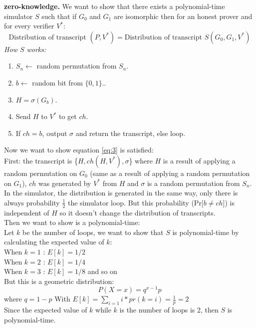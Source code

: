 \documentclass[12pt,a4paper]{article}
\begin{document}
\textbf{zero-knowledge.}
We want to show that there exists a polynomial-time simulator $S$ such that if $G_0$ and  $G_1$ are isomorphic then for an honest prover and for every verifier $V^*$:
\begin{equation}
\text{Distribution of transcript }(P,V^*)=\text{Distribution of transcript } S(G_0,G_1,V^*) 
\label{eq:3}
\end{equation}
\textit{How $S$ works:}
\begin{enumerate}	
	\item
	\begin{enumerate}
$S_n \longleftarrow $ random permutation from $S_n$. 
\end{enumerate}
\item
\begin{enumerate}
$b \longleftarrow$ random bit from $\{0,1\}.$.
\end{enumerate}
\item
\begin{enumerate}
$H=\sigma (G_b)$.
\end{enumerate}
\item
\begin{enumerate}
Send $H$ to $V^*$ to get $ch$.
\end{enumerate}
\item
\begin{enumerate}
If $ch=b$, output $\sigma$ and return the transcript, else loop.
\end{enumerate}
\end{enumerate}
Now we want to show equation \ref{eq:3}  is satisfied:\\
First: the transcript is \{$H,ch(H,V^*),\sigma$\} where $H$ is a result of applying a random permutation on $G_0$ (same as a result of applying a random permutation on $G_1$), $ch$ was generated by $V^*$ from $H$ and $\sigma$ is a random permutation from $S_n$.\\
In the simulator, the distribution is generated in the same way, only there is always probability $\frac{1}{2}$ the simulator loop. But this probability (Pr[$b\neq ch$])  is independent of $H$ so it doesn’t change the distribution of transcripts.\\
Then we want to show is a polynomial-time:\\
Let $k$ be the number of loops, we want to show that $S$ is polynomial-time by calculating the expected value of $k$:\\
When $k=1$ : $E[k]=1/2$\\
When $k=2$ : $E[k]=1/4$\\
When $k=3$ : $E[k]=1/8$ and so on \\
But this is a geometric distribution:
$$P(X = x) = q^{x-1}p$$ where $q = 1 - p$ 
With $E[k]=\sum_{i=1} i*pr(k=i) =\frac{1}{p}=2$\\
Since the expected value of $k$ while $k$ is the number of loops is 2, then $S$ is polynomial-time. 




 
\end{document}

